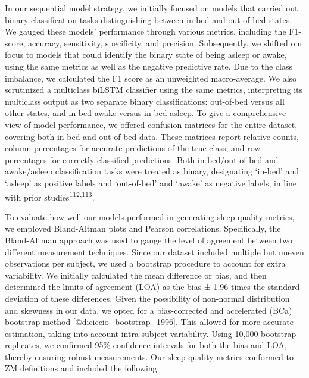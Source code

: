\documentclass[
  9pt,
]{scrbook}
\begin{document}
In our sequential model strategy, we initially focused on models that
carried out binary classification tasks distinguishing between in-bed
and out-of-bed states. We gauged these models' performance through
various metrics, including the F1-score, accuracy, sensitivity,
specificity, and precision. Subsequently, we shifted our focus to models
that could identify the binary state of being asleep or awake, using the
same metrics as well as the negative predictive rate. Due to the class
imbalance, we calculated the F1 score as an unweighted macro-average. We
also scrutinized a multiclass biLSTM classifier using the same metrics,
interpreting its multiclass output as two separate binary
classifications: out-of-bed versus all other states, and in-bed-awake
versus in-bed-asleep. To give a comprehensive view of model performance,
we offered confusion matrices for the entire dataset, covering both
in-bed and out-of-bed data. These matrices report relative counts,
column percentages for accurate predictions of the true class, and row
percentages for correctly classified predictions. Both in-bed/out-of-bed
and awake/asleep classification tasks were treated as binary,
designating `in-bed' and `asleep' as positive labels and `out-of-bed'
and `awake' as negative labels, in line with prior
studies\textsuperscript{\protect\hyperlink{ref-hjorth_measure_2012}{112},\protect\hyperlink{ref-kushida_comparison_2001}{113}}.

To evaluate how well our models performed in generating sleep quality
metrics, we employed Bland-Altman plots and Pearson correlations.
Specifically, the Bland-Altman approach was used to gauge the level of
agreement between two different measurement techniques. Since our
dataset included multiple but uneven observations per subject, we used a
bootstrap procedure to account for extra variability. We initially
calculated the mean difference or bias, and then determined the limits
of agreement (LOA) as the bias ± 1.96 times the standard deviation of
these differences. Given the possibility of non-normal distribution and
skewness in our data, we opted for a bias-corrected and accelerated
(BCa) bootstrap method {[}@diciccio\_bootstrap\_1996{]}. This allowed
for more accurate estimation, taking into account intra-subject
variability. Using 10,000 bootstrap replicates, we confirmed 95\%
confidence intervals for both the bias and LOA, thereby ensuring robust
measurements. Our sleep quality metrics conformed to ZM definitions and
included the following:
\end{document}

